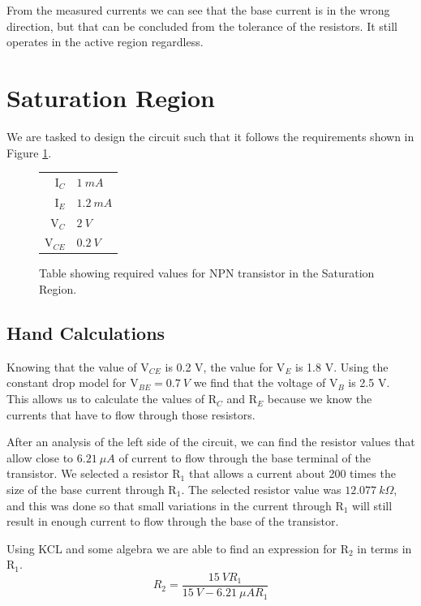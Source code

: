\documentclass{article}
\begin{document}
From the measured currents we can see that the base
current is in the wrong direction, but that can
be concluded from the tolerance of the resistors. It
still operates in the active region regardless.

% 
% 
\newpage
% 
% 
% 

\section{Saturation Region}
We are tasked to design the circuit such that
it follows the requirements shown in Figure
\ref{table:satTable}.

\begin{figure}[h!]
\begin{center}
  \begin{tabular}{r|l}
    I$_C$ & $\SI{1}{mA}$ \\
    I$_E$ & $\SI{1.2}{mA}$ \\
    V$_C$ & $\SI{2}{V}$ \\
    V$_{CE}$ & $\SI{0.2}{V}$ \\
  \end{tabular}
\end{center}
\caption{Table showing required values for NPN transistor
in the Saturation Region.}
\label{table:satTable}
\end{figure}

\subsection{Hand Calculations}

Knowing that the value of V$_{CE}$ is 0.2 V, the
value for V$_E$ is 1.8 V. Using the constant drop 
model for V$_{BE}=\SI{0.7}{V}$ we find that the
voltage of V$_B$ is 2.5 V. This allows us to calculate
the values of R$_C$ and R$_E$ because we know
the currents that have to flow through those resistors.



After an analysis of the left side of the circuit,
we can find the resistor values that allow close to
$\SI{6.21}{\mu A}$ of current to flow through the base
terminal of the transistor.  We selected a resistor
R$_1$ that allows a current about 200 times the size
of the base current through R$_1$.  The selected resistor
value was $\SI{12.077}{k \Omega}$, and this was done
so that small variations in the current through R$_1$
will still result in enough current to flow through
the base of the transistor.

Using KCL and some algebra we are able to find an
expression for R$_2$ in terms in R$_1$. 
$$R_2=\frac{\SI{15}{V} R_1}{\SI{15}{V} - \SI{6.21}{\mu A} R_1}$$
\end{document}
